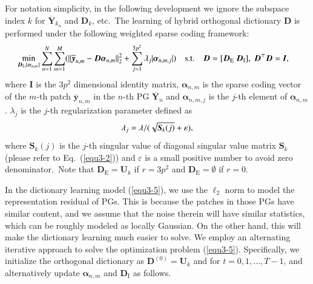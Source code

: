 For notation simplicity, in the following development we ignore the subspace index $k$ for $\bm{\overline{Y}}_{k_{n}}$ and $\bm{D}_{k}$, etc.\ The learning of hybrid orthogonal dictionary $\bm{D}$ is performed under the following weighted sparse coding
framework:
\vspace{-2mm}
\begin{equation}\label{equ3-5}
\vspace{-2mm}
\begin{split}
\min_{\bm{D}_{\text{I}},\{\bm{\alpha}_{n,m}\}}
&\sum_{n=1}^{N}\sum_{m=1}^{M}(\|\bm{\overline{y}}_{n,m}-\bm{D}\bm{\alpha}_{n,m}\|_{2}^{2}+\sum_{j=1}^{3p^{2}}\lambda_{j}|\bm{\alpha}_{n,m,j}|)
\quad
\text{s.t.}
\quad
\bm{D}=[\bm{D}_{\text{E}}\ \bm{D}_{\text{I}}],\ \bm{D}^{\top}\bm{D} = \bm{I},
\end{split}
\end{equation}
where $\bm{I}$ is the $3p^{2}$ dimensional identity matrix, $\bm{\alpha}_{n,m}$ is the sparse coding vector of the $m$-th patch $\bm{\overline{y}}_{n,m}$ in the $n$-th PG $\bm{\overline{Y}}_{n}$ and $\bm{\alpha}_{n,m,j}$ is the $j$-th element of $\bm{\alpha}_{n,m}$. $\lambda_{j}$ is the $j$-th regularization parameter defined as
\vspace{-2mm}
\begin{equation}\label{equ3-6}
\vspace{-2mm}
\lambda_{j} = \lambda/(\sqrt{\bm{S}_{k}(j)}+\varepsilon),
\end{equation}
where $\bm{S}_{k}(j)$ is the $j$-th singular value of diagonal singular value matrix $\bm{S}_{k}$ (please refer to Eq.\ (\ref{equ3-2})) and $\varepsilon$ is a small positive number to avoid zero denominator.\ Note that $\bm{D}_{\text{E}}=\bm{U}_{k}$ if $r=3p^{2}$ and $\bm{D}_{\text{E}}=\emptyset$ if $r=0$.

In the dictionary learning model (\ref{equ3-5}), we use the $\ell_{2}$ norm to model the representation residual of PGs. This is because the patches in those PGs have similar content, and we assume that the noise therein will have similar statistics, which can be roughly modeled as locally Gaussian. On the other hand, this will make the dictionary learning much easier to solve. We employ an alternating iterative approach to solve the optimization problem (\ref{equ3-5}). Specifically, we initialize the orthogonal dictionary as $\bm{D}^{(0)}=\bm{U}_{k}$ and for $t=0,1, ...,T-1$, and alternatively update $\bm{\alpha}_{n,m}$ and $\bm{D}_{\text{I}}$ as follows.

